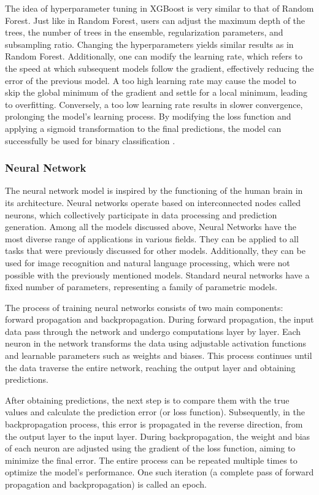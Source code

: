 The idea of hyperparameter tuning in XGBoost is very similar to that of Random Forest. Just like in Random Forest, users can adjust the maximum depth of the trees, the number of trees in the ensemble, regularization parameters, and subsampling ratio. Changing the hyperparameters yields similar results as in Random Forest. Additionally, one can modify the learning rate, which refers to the speed at which subsequent models follow the gradient, effectively reducing the error of the previous model. A too high learning rate may cause the model to skip the global minimum of the gradient and settle for a local minimum, leading to overfitting. Conversely, a too low learning rate results in slower convergence, prolonging the model's learning process. By modifying the loss function and applying a sigmoid transformation to the final predictions, the model can successfully be used for binary classification \autocite{Chen2016}.

\subsubsection{Neural Network}
The neural network model is inspired by the functioning of the human brain in its architecture. Neural networks operate based on interconnected nodes called neurons, which collectively participate in data processing and prediction generation. Among all the models discussed above, Neural Networks have the most diverse range of applications in various fields. They can be applied to all tasks that were previously discussed for other models. Additionally, they can be used for image recognition and natural language processing, which were not possible with the previously mentioned models. Standard neural networks have a fixed number of parameters, representing a family of parametric models.

The process of training neural networks consists of two main components: forward propagation and backpropagation. During forward propagation, the input data pass through the network and undergo computations layer by layer. Each neuron in the network transforms the data using adjustable activation functions and learnable parameters such as weights and biases. This process continues until the data traverse the entire network, reaching the output layer and obtaining predictions.

After obtaining predictions, the next step is to compare them with the true values and calculate the prediction error (or loss function). Subsequently, in the backpropagation process, this error is propagated in the reverse direction, from the output layer to the input layer. During backpropagation, the weight and bias of each neuron are adjusted using the gradient of the loss function, aiming to minimize the final error. The entire process can be repeated multiple times to optimize the model's performance. One such iteration (a complete pass of forward propagation and backpropagation) is called an epoch.


